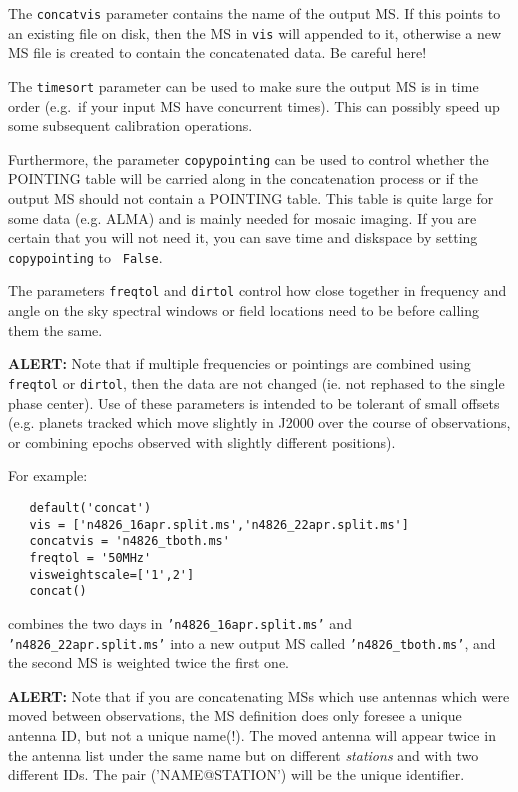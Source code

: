 The {\tt concatvis} parameter contains the name of the output MS.
If this points to an existing file on disk, then the MS in
{\tt vis} will appended to it,  otherwise a new MS file
is created to contain the concatenated data.  Be careful here!

The {\tt timesort} parameter can be used to make sure the output
MS is in time order (e.g.\ if your input MS have concurrent times).
This can possibly speed up some subsequent calibration operations.

Furthermore, the parameter {\tt copypointing} can be used to control
whether the POINTING table will be carried along in the concatenation
process or if the output MS should not contain a POINTING table. This
table is quite large for some data (e.g. ALMA) and is mainly needed
for mosaic imaging.  If you are certain that you will not need it, you
can save time and diskspace by setting {\tt copypointing} to {\tt
  False}.

The parameters {\tt freqtol} and {\tt dirtol} control how close
together in frequency and angle on the sky spectral windows or field
locations need to be before calling them the same.

{\bf ALERT:} Note that if multiple frequencies or pointings are
combined using {\tt freqtol} or {\tt dirtol}, then the data are not
changed (ie. not rephased to the single phase center).  Use of these 
parameters is intended to be tolerant of small offsets (e.g. planets
tracked which move slightly in J2000 over the course of observations,
or combining epochs observed with slightly different positions).

For example:
\small
\begin{verbatim}
   default('concat')
   vis = ['n4826_16apr.split.ms','n4826_22apr.split.ms']
   concatvis = 'n4826_tboth.ms'
   freqtol = '50MHz'
   visweightscale=['1',2']
   concat()
\end{verbatim}
\normalsize
combines the two days in {\tt 'n4826\_16apr.split.ms'} and
{\tt 'n4826\_22apr.split.ms'} into a new output MS called
{\tt 'n4826\_tboth.ms'}, and the second MS is weighted twice the first one.


{\bf ALERT:} Note that if you are concatenating MSs which use
antennas which were moved between observations, the MS definition 
does only foresee a unique antenna ID, but not a unique name(!). 
The moved antenna will
appear twice in the antenna list under the same name but on different
{\it stations} and with two different IDs. The pair ('NAME@STATION')
will be the unique identifier.

